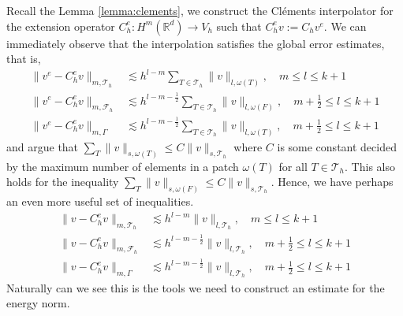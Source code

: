 Recall the Lemma \ref{lemma:clements}, we construct the Cléments interpolator for the extension operator $C_{h}^{e}: H^{m}( \mathbb{R} ^{d}) \to V_{h}$ such that  $C ^{e} _{h} v := C _{h} v^{e} $.
We can immediately observe that the interpolation satisfies the global error estimates, that is,
\begin{align*}
    \| v^e - C _{h}^{e} v \|_{  m, \mathcal{T} _{h} }^{  } & \lesssim h^{l-m}\sum_{T \in \mathcal{T}_h} \| v \|_{ l, \omega(T) }^{  }, \quad m\le l\le k+1 \\
    \| v^e - C ^{e}_{h}v \|_{ m,\mathcal{F} _{h} }^{  } & \lesssim h^{l-m-\frac{1}{2}}\sum_{T \in \mathcal{T}_h} \| v \|_{ l, \omega(F)  }^{  }, \quad m+\frac{1}{2}  \le  l \le   k+1 \\
\| v^e - C ^{e}_{h}v \|_{ m, \Gamma }^{  } & \lesssim h^{l-m-\frac{1}{2}} \sum_{T \in \mathcal{T}_h}  \| v \|_{ l,  \omega(T)  }^{  }, \quad m+\frac{1}{2}  \le  l \le  k+1
\end{align*}
 and argue that $ \sum_{T}^{} \| v \|_{s,\omega ( T)   }^{  } \le C  \| v \|_{s, \mathcal{T}_{h}   }^{  } $ where $C$ is some constant decided by the maximum number of elements in a patch
    $\omega( T)  $ for all $T \in \mathcal{T} _{h}$. This also holds for the inequality $ \sum_{T}^{} \| v \|_{s,\omega ( F)   }^{  } \le C  \| v \|_{s, \mathcal{T}_{h}   }^{  } $. Hence, we have perhaps an even more useful set of inequalities.
\begin{align}
    \label{eq:bi_projection_estimates_1}
    \| v - C _{h}^{e} v \|_{  m, \mathcal{T} _{h} }^{  } & \lesssim h^{l-m} \| v \|_{ l, \mathcal{T} _{h} }^{  }, \quad m\le l\le k+1 \\
    \label{eq:bi_projection_estimates_2}
    \| v - C ^{e}_{h}v \|_{ m,\mathcal{F} _{h} }^{  } & \lesssim h^{l-m-\frac{1}{2}} \| v \|_{ l, \mathcal{T} _{h}  }^{  }, \quad m+\frac{1}{2}  \le  l \le   k+1 \\
    \label{eq:bi_projection_estimates_3}
\| v - C ^{e}_{h}v \|_{ m, \Gamma }^{  } & \lesssim h^{l-m-\frac{1}{2}}   \| v \|_{ l,  \mathcal{T} _{h}  }^{  }, \quad m+\frac{1}{2}  \le  l \le  k+1
\end{align}
Naturally can we see this is the tools we need to construct an estimate for the energy norm.

